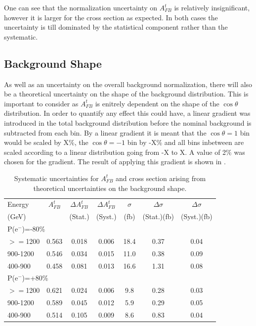 One can see that the normalization uncertainty on $A_{FB}^t$ is relatively insignificant, however it is larger for the cross section as expected. In both cases the uncertainty is till dominated by the statistical component rather than the systematic.

\subsection{Background Shape}

As well as an uncertainty on the overall background normalization, there will also be a theoretical uncertainty on the shape of the background distribution. This is important to consider as $A_{FB}^t$ is enitrely dependent on the shape of the $\cos\theta$ distribution. In order to quantify any effect this could have, a linear gradient was introduced in the total background distribution before the nominal background is subtracted from each bin. By a linear gradient it is meant that the $\cos\theta=1$ bin would be scaled by X\%, the $\cos\theta=-1$ bin by -X\% and all bins inbetween are scaled according to a linear distribution going from -X to X. A value of 2\% was chosen for the gradient. The result of applying this gradient is shown in .

\begin{table}
  \centering
  \begin{tabular}{l|c|c|c|c|c|c}
    \toprule
     Energy & $A_{FB}^t$ & $\Delta A_{FB}^t$  & $\Delta A^t_{FB}$ &  $\sigma$  &  $\Delta\sigma$  &  $\Delta\sigma$ \\
     (GeV) &  & (Stat.) & (Syst.) &  (fb) &  (Stat.)(fb) &  (Syst.)(fb)\\
     \midrule
     \midrule
     \multicolumn{7}{l}{P(e$^-$)=-80\%} \\
     \midrule
     \midrule
    $>=$1200   & 0.563 & 0.018 & 0.006 & 18.4 & 0.37 & 0.04\\
    \midrule
    900-1200   & 0.546 & 0.034 & 0.015 & 11.0 & 0.38 & 0.09\\
    \midrule
    400-900    & 0.458 & 0.081 & 0.013 & 16.6 & 1.31 & 0.08\\
    \midrule
    \midrule
   \multicolumn{7}{l}{ P(e$^-$)=+80\%}\\
    \midrule
    \midrule
    $>=$1200  & 0.621 & 0.024 & 0.006 & 9.8 & 0.28 & 0.03 \\
    \midrule
    900-1200  & 0.589 & 0.045 & 0.012 & 5.9 & 0.29 & 0.05 \\
    \midrule
    400-900   & 0.514 & 0.105 & 0.009 & 8.6 & 0.83 & 0.04 \\
    \bottomrule
  \end{tabular}
  \caption{Systematic uncertainties for $A_{FB}^t$ and cross section arising from theoretical uncertainties on the background shape.}
  \label{tab:bkggrad}
\end{table}

